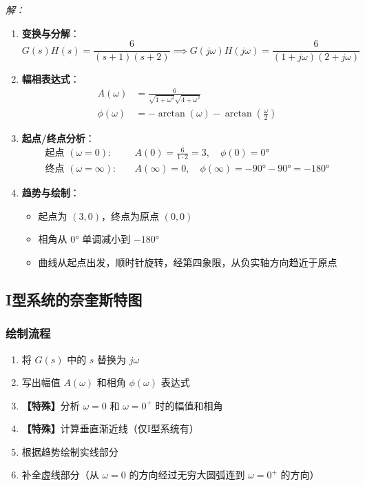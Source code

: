 \textit{解：}
\begin{enumerate}
    \item \textbf{变换与分解}：
    \[G(s)H(s) = \frac{6}{(s+1)(s+2)} \implies G(j\omega)H(j\omega) = \frac{6}{(1+j\omega)(2+j\omega)}\]
    
    \item \textbf{幅相表达式}：
    \begin{align*}
    A(\omega) &= \frac{6}{\sqrt{1+\omega^2}\sqrt{4+\omega^2}} \\
    \phi(\omega) &= -\arctan(\omega) - \arctan(\frac{\omega}{2})
    \end{align*}
    
    \item \textbf{起点/终点分析}：
    \begin{align*}
    \text{起点 } (\omega=0): \quad & A(0) = \frac{6}{1 \cdot 2} = 3, \quad \phi(0) = 0° \\
    \text{终点 } (\omega=\infty): \quad & A(\infty) = 0, \quad \phi(\infty) = -90° - 90° = -180°
    \end{align*}
    
    \item \textbf{趋势与绘制}：
    \begin{itemize}
        \item 起点为 $(3, 0)$，终点为原点 $(0, 0)$
        \item 相角从 $0°$ 单调减小到 $-180°$
        \item 曲线从起点出发，顺时针旋转，经第四象限，从负实轴方向趋近于原点
    \end{itemize}
\end{enumerate}

\subsection{I型系统的奈奎斯特图}

\subsubsection{绘制流程}
\begin{enumerate}
    \item 将 $G(s)$ 中的 $s$ 替换为 $j\omega$
    \item 写出幅值 $A(\omega)$ 和相角 $\phi(\omega)$ 表达式
    \item \textbf{【特殊】}分析 $\omega=0$ 和 $\omega=0^+$ 时的幅值和相角
    \item \textbf{【特殊】}计算垂直渐近线（仅I型系统有）
    \item 根据趋势绘制实线部分
    \item 补全虚线部分（从 $\omega=0$ 的方向经过无穷大圆弧连到 $\omega=0^+$ 的方向）
\end{enumerate}


